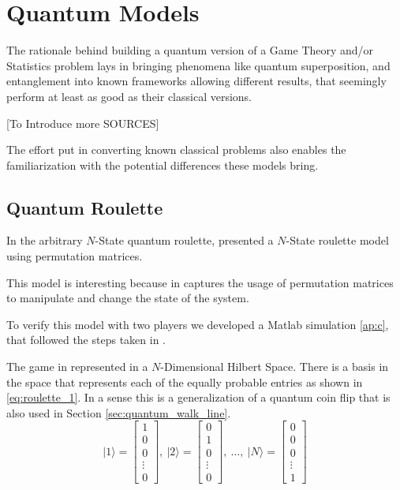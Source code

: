 \section{Quantum Models}
\label{sec:quantum_models}

The rationale behind building a quantum version of a Game Theory and/or Statistics problem lays in bringing phenomena like quantum superposition, and entanglement into known frameworks allowing different results, that seemingly perform at least as good as their classical versions.

[To Introduce more SOURCES]

The effort put in converting known classical problems also enables the familiarization with the potential differences these models bring.

\subsection{Quantum Roulette}
\label{subsec:quantum_roulette}

In the arbitrary $N$-State quantum roulette,\cite{Salimi2009} presented a $N$-State roulette model using permutation matrices. 

This model is interesting because in captures the usage of permutation matrices to manipulate and change the state of the system.

To verify this model with two players we developed a Matlab simulation \ref{ap:c}, that followed the steps taken in \cite{Salimi2009}.

The game in represented in a $N$-Dimensional Hilbert Space. There is a basis in the space that represents each of the equally probable entries as shown in \ref{eq:roulette_1}. In a sense this is a generalization of a quantum coin flip that is also used in Section \ref{sec:quantum_walk_line}.
\begin{equation}
\label{eq:roulette_1}
\vert1\rangle=\left[\begin{array}{c}
1\\
0\\
0\\
\vdots\\
0
\end{array}\right],\:\vert2\rangle=\left[\begin{array}{c}
0\\
1\\
0\\
\vdots\\
0
\end{array}\right],\:\ldots,\:\vert N\rangle=\left[\begin{array}{c}
0\\
0\\
0\\
\vdots\\
1
\end{array}\right]
\end{equation}

